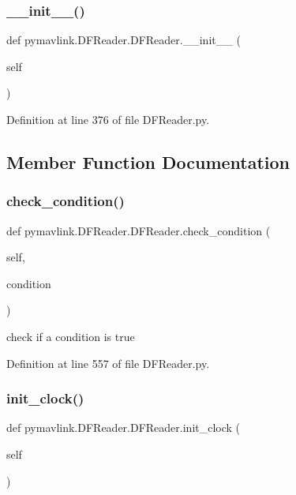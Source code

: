 \subsubsection{\texorpdfstring{\_\_init\_\_()}{\_\_init\_\_()}}
{\footnotesize\ttfamily def pymavlink.\+D\+F\+Reader.\+D\+F\+Reader.\+\_\+\+\_\+init\+\_\+\+\_\+ (\begin{DoxyParamCaption}\item[{}]{self }\end{DoxyParamCaption})}



Definition at line 376 of file D\+F\+Reader.\+py.



\subsection{Member Function Documentation}
\mbox{\label{classpymavlink_1_1DFReader_1_1DFReader_a793c18e4b164a17f7088a0cec9a647d5}} 
\subsubsection{\texorpdfstring{check\_condition()}{check\_condition()}}
{\footnotesize\ttfamily def pymavlink.\+D\+F\+Reader.\+D\+F\+Reader.\+check\+\_\+condition (\begin{DoxyParamCaption}\item[{}]{self,  }\item[{}]{condition }\end{DoxyParamCaption})}

\begin{DoxyVerb}check if a condition is true\end{DoxyVerb}
 

Definition at line 557 of file D\+F\+Reader.\+py.

\mbox{\label{classpymavlink_1_1DFReader_1_1DFReader_ac2bc47ae655fa152f8e434470731cbda}} 
\subsubsection{\texorpdfstring{init\_clock()}{init\_clock()}}
{\footnotesize\ttfamily def pymavlink.\+D\+F\+Reader.\+D\+F\+Reader.\+init\+\_\+clock (\begin{DoxyParamCaption}\item[{}]{self }\end{DoxyParamCaption})}


